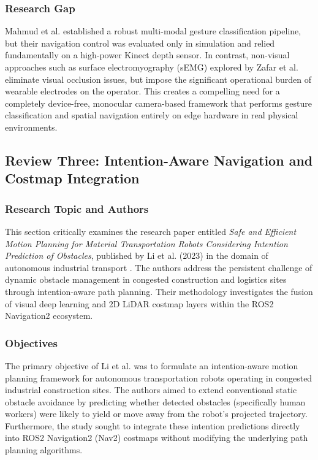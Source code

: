 \subsubsection{Research Gap}
Mahmud et al. established a robust multi-modal gesture classification pipeline, but their navigation control was evaluated only in simulation and relied fundamentally on a high-power Kinect depth sensor. In contrast, non-visual approaches such as surface electromyography (sEMG) explored by Zafar et al. \cite{zafar2023} eliminate visual occlusion issues, but impose the significant operational burden of wearable electrodes on the operator. This creates a compelling need for a completely device-free, monocular camera-based framework that performs gesture classification and spatial navigation entirely on edge hardware in real physical environments.

\subsection{Review Three: Intention-Aware Navigation and Costmap Integration}

\subsubsection{Research Topic and Authors}
This section critically examines the research paper entitled \textit{Safe and Efficient Motion Planning for Material Transportation Robots Considering Intention Prediction of Obstacles}, published by Li et al. (2023) in the domain of autonomous industrial transport \cite{li2023}. The authors address the persistent challenge of dynamic obstacle management in congested construction and logistics sites through intention-aware path planning. Their methodology investigates the fusion of visual deep learning and 2D LiDAR costmap layers within the ROS2 Navigation2 ecosystem.

\subsubsection{Objectives}
The primary objective of Li et al. was to formulate an intention-aware motion planning framework for autonomous transportation robots operating in congested industrial construction sites. The authors aimed to extend conventional static obstacle avoidance by predicting whether detected obstacles (specifically human workers) were likely to yield or move away from the robot's projected trajectory. Furthermore, the study sought to integrate these intention predictions directly into ROS2 Navigation2 (Nav2) costmaps without modifying the underlying path planning algorithms.

